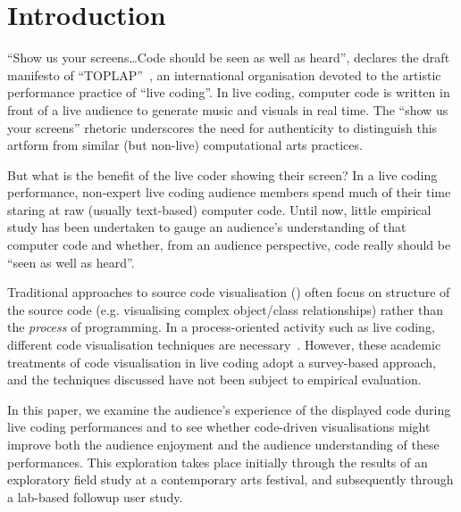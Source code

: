 \documentclass{sig-alternate}
\begin{document}



\section{Introduction}


``Show us your screens\ldots Code should be seen as well as heard'',
declares the draft manifesto of ``TOPLAP''~\cite{Toplap}, an
international organisation devoted to the artistic performance
practice of ``live coding''. In live coding, computer code is written
in front of a live audience to generate music and visuals in real
time. The ``show us your screens'' rhetoric underscores the need for
authenticity to distinguish this artform from similar (but non-live)
computational arts practices.

But what is the benefit of the live coder showing their screen? In a
live coding performance, non-expert live coding audience members spend
much of their time staring at raw (usually text-based) computer code.
Until now, little empirical study has been undertaken to gauge an
audience's understanding of that computer code and whether, from an
audience perspective, code really should be ``seen as well as heard''.

Traditional approaches to source code visualisation (\cite[see][for a
review]{Novais2013}) often focus on structure of the source code (e.g.
visualising complex object/class relationships) rather than the
\emph{process} of programming. In a process-oriented activity such as
live coding, different code visualisation techniques are
necessary~\cite{McLean2010b,Magnusson2013}. However, these academic
treatments of code visualisation in live coding adopt a survey-based
approach, and the techniques discussed have not been subject to
empirical evaluation.

In this paper, we examine the audience's experience of the displayed
code during live coding performances and to see whether code-driven
visualisations might improve both the audience enjoyment and the
audience understanding of these performances. This exploration takes
place initially through the results of an exploratory field study at a
contemporary arts festival, and subsequently through a lab-based
followup user study.
\end{document}
